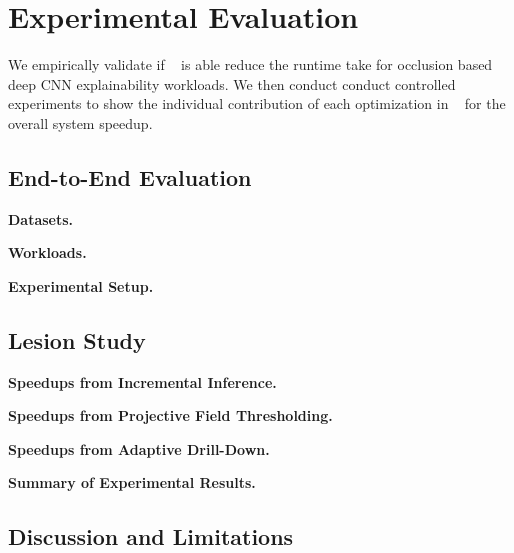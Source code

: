 \section{Experimental Evaluation}
We empirically validate if \system~ is able reduce the runtime take for occlusion based deep CNN explainability workloads.
We then conduct conduct controlled experiments to show the individual contribution of each optimization in \system~ for the overall system speedup.

\subsection{End-to-End Evaluation}

\vspace{2mm}
\noindent \textbf{Datasets.}

\vspace{2mm}
\noindent \textbf{Workloads.}

\vspace{2mm}
\noindent \textbf{Experimental Setup.}

\subsection{Lesion Study}

\vspace{2mm}
\noindent \textbf{Speedups from Incremental Inference.}

\vspace{2mm}
\noindent \textbf{Speedups from Projective Field Thresholding.}

\vspace{2mm}
\noindent \textbf{Speedups from Adaptive Drill-Down.}

\vspace{2mm}
\noindent \textbf{Summary of Experimental Results.}

\subsection{Discussion and Limitations}